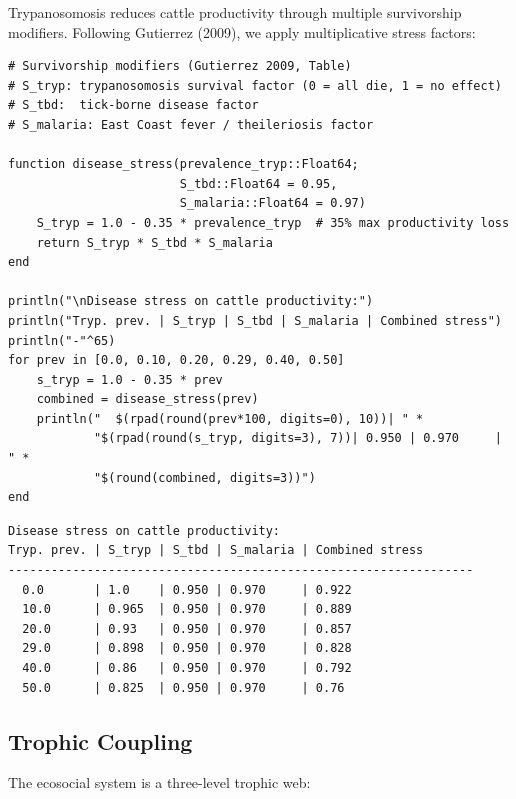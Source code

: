 \label{14771490503796160677}{}


Trypanosomosis reduces cattle productivity through multiple survivorship modifiers. Following Gutierrez (2009), we apply multiplicative stress factors:




\begin{verbatim}
# Survivorship modifiers (Gutierrez 2009, Table)
# S_tryp: trypanosomosis survival factor (0 = all die, 1 = no effect)
# S_tbd:  tick-borne disease factor
# S_malaria: East Coast fever / theileriosis factor

function disease_stress(prevalence_tryp::Float64;
                        S_tbd::Float64 = 0.95,
                        S_malaria::Float64 = 0.97)
    S_tryp = 1.0 - 0.35 * prevalence_tryp  # 35% max productivity loss
    return S_tryp * S_tbd * S_malaria
end

println("\nDisease stress on cattle productivity:")
println("Tryp. prev. | S_tryp | S_tbd | S_malaria | Combined stress")
println("-"^65)
for prev in [0.0, 0.10, 0.20, 0.29, 0.40, 0.50]
    s_tryp = 1.0 - 0.35 * prev
    combined = disease_stress(prev)
    println("  $(rpad(round(prev*100, digits=0), 10))| " *
            "$(rpad(round(s_tryp, digits=3), 7))| 0.950 | 0.970     | " *
            "$(round(combined, digits=3))")
end
\end{verbatim}




\begin{verbatim}
Disease stress on cattle productivity:
Tryp. prev. | S_tryp | S_tbd | S_malaria | Combined stress
-----------------------------------------------------------------
  0.0       | 1.0    | 0.950 | 0.970     | 0.922
  10.0      | 0.965  | 0.950 | 0.970     | 0.889
  20.0      | 0.93   | 0.950 | 0.970     | 0.857
  29.0      | 0.898  | 0.950 | 0.970     | 0.828
  40.0      | 0.86   | 0.950 | 0.970     | 0.792
  50.0      | 0.825  | 0.950 | 0.970     | 0.76
\end{verbatim}



\subsection{Trophic Coupling}



\label{3705185120451356836}{}


The ecosocial system is a three-level trophic web:



